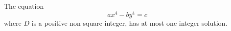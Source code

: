 \begin{proposition}\label{eq:129}
    The equation
\[
    ax^4-by^4=c
\]
    where $D$ is a positive non-square integer, has at most one integer solution.
\end{proposition}
